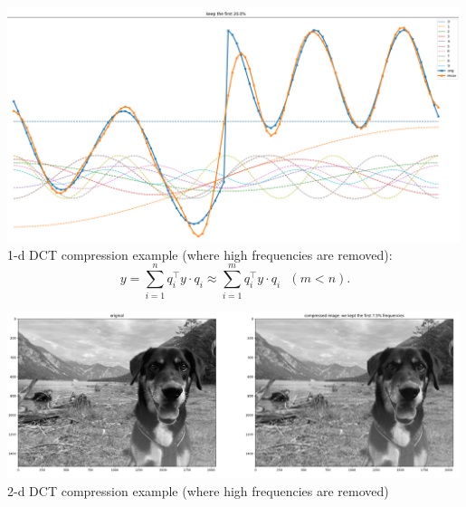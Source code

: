 \begin{frame}[c]
	\centering
	\includegraphics[width=0.99\textwidth]{./media/dct-1d.png}
	1-d DCT compression example (where high frequencies are removed):
	$$
	y 
	= \sum_{i=1}^n q_i^\top y \cdot q_i
	\approx \sum_{i=1}^m q_i^\top y \cdot q_i ~~~(m<n).$$
\end{frame}
\begin{frame}[c]
	\centering
	\includegraphics[width=0.99\textwidth]{./media/dct-2d.png}
	2-d DCT compression example (where high frequencies are removed)
\end{frame}


